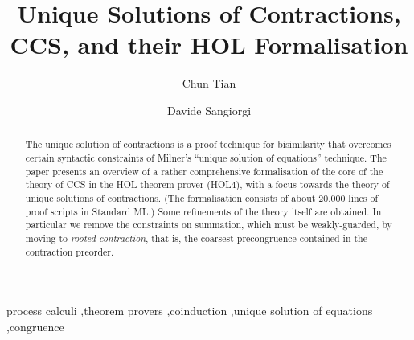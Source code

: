 \documentclass[review]{elsarticle}
\newcommand*\hl{}
\begin{document}
\begin{frontmatter}

\title{Unique Solutions of Contractions, CCS, and their HOL
  Formalisation}

\author[mymainaddress]{Chun Tian}
\address[mymainaddress]{Fondazione Bruno Kessler, Trento, Italy}

\author[mysecondaryaddress]{Davide Sangiorgi}
\address[mysecondaryaddress]{Universit\`a di Bologna and INRIA, Bologna, Italy}

\begin{abstract}
  The unique solution of contractions is a proof technique for
  bisimilarity that overcomes certain syntactic constraints of
  Milner's ``unique solution of equations'' technique.  The paper
  presents an overview of a rather comprehensive formalisation of the
  core of the theory of CCS in the HOL theorem prover (HOL4), with a
  focus towards the theory of unique solutions of contractions.  (The
  formalisation consists of about 20,000 lines of proof scripts in
  Standard ML.)  Some refinements of the theory itself are obtained.
  In particular we remove the constraints \hl{on summation,
  which must be weakly-guarded,} by moving to \emph{rooted
  contraction}, that is, the coarsest
  precongruence contained in the contraction preorder.

\end{abstract}

\begin{keyword}
process calculi \sep theorem provers \sep coinduction \sep unique
solution of equations \sep congruence
\end{keyword}

\end{frontmatter}
\end{document}

